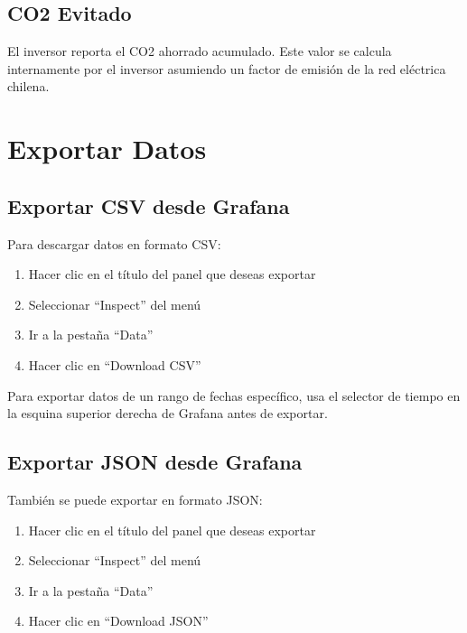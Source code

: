\documentclass[12pt,a4paper]{article}
\begin{document}
\subsection{CO2 Evitado}

El inversor reporta el CO2 ahorrado acumulado. Este valor se calcula internamente por el inversor asumiendo un factor de emisi\'on de la red el\'ectrica chilena.

\section{Exportar Datos}

\subsection{Exportar CSV desde Grafana}

Para descargar datos en formato CSV:

\begin{enumerate}
    \item Hacer clic en el t\'itulo del panel que deseas exportar
    \item Seleccionar ``Inspect'' del men\'u
    \item Ir a la pesta\~na ``Data''
    \item Hacer clic en ``Download CSV''
\end{enumerate}

\begin{tipbox}
Para exportar datos de un rango de fechas espec\'ifico, usa el selector de tiempo en la esquina superior derecha de Grafana antes de exportar.
\end{tipbox}

\subsection{Exportar JSON desde Grafana}

Tambi\'en se puede exportar en formato JSON:

\begin{enumerate}
    \item Hacer clic en el t\'itulo del panel que deseas exportar
    \item Seleccionar ``Inspect'' del men\'u
    \item Ir a la pesta\~na ``Data''
    \item Hacer clic en ``Download JSON''
\end{enumerate}
\end{document}

